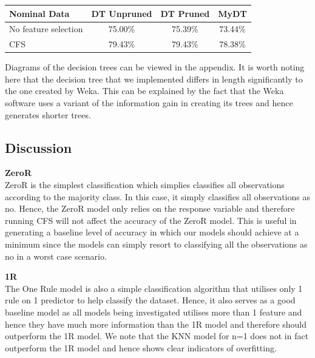 \documentclass[12pt]{article}
\begin{document}
\begin{table}[H]
\centering
\begin{tabular}{|l|c|c|c|}
\hline
\textbf{Nominal Data}                       & \multicolumn{1}{l|}{\textbf{DT Unpruned}} & \multicolumn{1}{l|}{\textbf{DT Pruned}} & \multicolumn{1}{l|}{\textbf{MyDT}} \\ \hline
No feature selection                  & 75.00\%                            & 75.39\%                                                      & 73.44\%                                             \\ \hline
CFS                     & 79.43\%                            & 79.43\%                                                      & 78.38\%                                             \\ \hline
\end{tabular}
\end{table}

Diagrams of the decision trees can be viewed in the appendix. It is worth noting here that the decision tree that we implemented differs in length significantly to the one created by Weka. This can be explained by the fact that the Weka software uses a variant of the information gain in creating its trees and hence generates shorter trees.

\subsection*{Discussion}

\textbf{ZeroR}\\
ZeroR  is the simplest classification which simplies classifies all observations according to the majority class. In this case, it simply classifies all observations as no. Hence, the ZeroR model only relies on the response variable and therefore running CFS will not affect the accuracy of the ZeroR model. This is useful in generating a baseline level of accuracy in which our models should achieve at a minimum since the models can simply resort to classifying all the observations as no in a worst case scenario. 

\textbf{1R}\\
The One Rule model is also a simple classification algorithm that utilises only 1 rule on 1 predictor to help classify the dataset. Hence, it also serves as a good baseline model as all models being investigated utilises more than 1 feature and hence they have much more information than the 1R model and therefore should outperform the 1R model. We note that the KNN model for n=1 does not in fact outperform the 1R model and hence shows clear indicators of overfitting.
\end{document}
